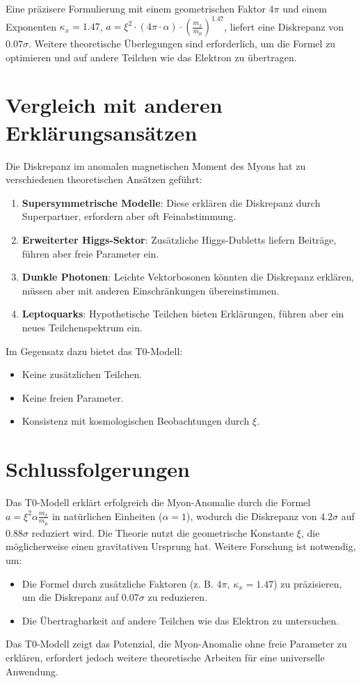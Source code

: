 \documentclass[12pt,a4paper]{article}
\newcommand{\xipar}{\xi}
\begin{document}
	\begin{warnung}
		Eine präzisere Formulierung mit einem geometrischen Faktor \(4\pi\) und einem Exponenten \(\kappa_x = 1.47\), \(a = \xipar^2 \cdot (4\pi \cdot \alpha) \cdot \left(\frac{m_x}{m_\mu}\right)^{1.47}\), liefert eine Diskrepanz von \(0.07\sigma\). Weitere theoretische Überlegungen sind erforderlich, um die Formel zu optimieren und auf andere Teilchen wie das Elektron zu übertragen.
	\end{warnung}
	
	\section{Vergleich mit anderen Erklärungsansätzen}
	
	Die Diskrepanz im anomalen magnetischen Moment des Myons hat zu verschiedenen theoretischen Ansätzen geführt:
	\begin{enumerate}
		\item \textbf{Supersymmetrische Modelle}: Diese erklären die Diskrepanz durch Superpartner, erfordern aber oft Feinabstimmung.
		\item \textbf{Erweiterter Higgs-Sektor}: Zusätzliche Higgs-Dubletts liefern Beiträge, führen aber freie Parameter ein.
		\item \textbf{Dunkle Photonen}: Leichte Vektorbosonen könnten die Diskrepanz erklären, müssen aber mit anderen Einschränkungen übereinstimmen.
		\item \textbf{Leptoquarks}: Hypothetische Teilchen bieten Erklärungen, führen aber ein neues Teilchenspektrum ein.
	\end{enumerate}
	Im Gegensatz dazu bietet das T0-Modell:
	\begin{itemize}
		\item Keine zusätzlichen Teilchen.
		\item Keine freien Parameter.
		\item Konsistenz mit kosmologischen Beobachtungen durch \(\xipar\).
	\end{itemize}
	
	\section{Schlussfolgerungen}
	
	Das T0-Modell erklärt erfolgreich die Myon-Anomalie durch die Formel \(a = \xipar^2 \alpha \frac{m_x}{m_\mu}\) in natürlichen Einheiten (\(\alpha = 1\)), wodurch die Diskrepanz von \(4.2\sigma\) auf \(0.88\sigma\) reduziert wird. Die Theorie nutzt die geometrische Konstante \(\xipar\), die möglicherweise einen gravitativen Ursprung hat. Weitere Forschung ist notwendig, um:
	\begin{itemize}
		\item Die Formel durch zusätzliche Faktoren (z. B. \(4\pi\), \(\kappa_x = 1.47\)) zu präzisieren, um die Diskrepanz auf \(0.07\sigma\) zu reduzieren.
		\item Die Übertragbarkeit auf andere Teilchen wie das Elektron zu untersuchen.
	\end{itemize}
	Das T0-Modell zeigt das Potenzial, die Myon-Anomalie ohne freie Parameter zu erklären, erfordert jedoch weitere theoretische Arbeiten für eine universelle Anwendung.
	
\end{document}

